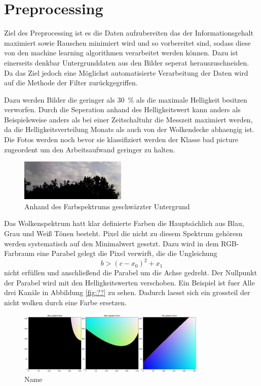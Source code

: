 \section{Preprocessing}
\label{sec:03_Preprocessing}
Ziel des Preprocessing ist es die Daten aufzubereiten das der
Informationsgehalt maximiert sowie Rauschen minimiert wird und so vorbereitet 
sind, sodass diese von den machine learning algorithmen verarbeitet werden können. 
Dazu ist einerseits denkbar Untergrunddaten aus den Bilder seperat
herauszuschneiden.
Da das Ziel jedoch eine Möglichst automatisierte Verarbeitung der Daten wird auf
die Methode der Filter zurückgegriffen.

Dazu werden Bilder die geringer als \SI{30}{\percent} als die maximale Helligkeit besitzen
verworfen. 
Durch die Seperation anhand des Helligkeitswert kann anders als Beispielsweise
anders als bei einer Zeitschaltuhr die Messzeit maximiert werden, da die
Helligkeitsverteilung Monats als auch von der Wolkendecke abhaengig ist.
Die Fotos werden noch bevor sie klassifiziert werden der Klasse bad picture
zugeordent um den Arbeitsaufwand geringer zu halten.

\begin{figure}
		\centering
		\includegraphics[width=0.45\textwidth]{pictures/cut_out.pdf}
\caption{Anhand des Farbspektrums geschwärzter Untergrund}
\label{fig:}
\end{figure}
Das Wolkenspektrum hatt klar definierte Farben die Hauptsächlich aus Blau, Grau
und Weiß Tönen besteht. 
Pixel die nicht zu diesem Spektrum gehöresn werden systematisch auf den
Minimalwert gesetzt.
Dazu wird in dem RGB-Farbraum eine Parabel gelegt die Pixel verwirft, die die
Ungleichung 
\begin{equation}
		b > (c - x_0)^2 + x_1
\end{equation}
nicht erfüllen und anschließend die Parabel um die Achse gedreht.
Der Nullpunkt der Parabel wird mit den Helligkeitswerten verschoben.
Ein Beispiel ist fuer Alle  drei Kanäle in Abbildung \ref{fig:??} zu sehen.
Dadurch laesst sich ein grossteil der nicht wolken durch eine Farbe ersetzen.
\begin{figure}
		\centering
		\includegraphics[width=0.8\textwidth]{pictures/colorcube.pdf}
		\caption{Name}
		\label{fig:name}
\end{figure}


